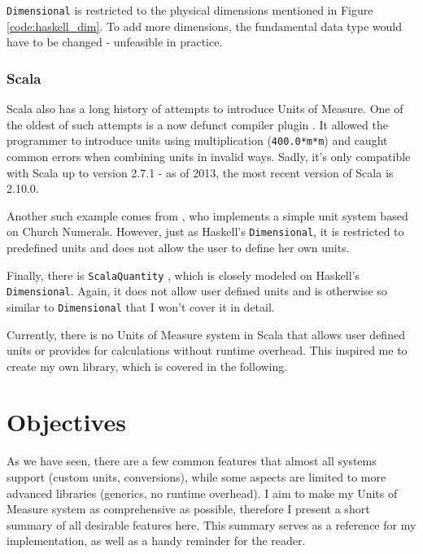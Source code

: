 \documentclass[12pt,oneside,a4paper]{scrbook}
\begin{document}
\verb/Dimensional/ is restricted to the physical dimensions mentioned in Figure \ref{code:haskell_dim}. To add more dimensions, the fundamental data type would have to be changed - unfeasible in practice.



\subsection{Scala}
Scala also has a long history of attempts to introduce Units of Measure. One of the oldest of such attempts is a now defunct compiler plugin \citep{Nygard09}. It allowed the programmer to introduce units using multiplication (\verb/400.0*m*m/) and caught common errors when combining units in invalid ways. Sadly, it's only compatible with Scala up to version 2.7.1 - as of 2013, the most recent version of Scala is 2.10.0.

Another such example comes from \citep{McBeath08}, who implements a simple unit system based on Church Numerals. However, just as Haskell's \verb/Dimensional/, it is restricted to predefined units and does not allow the user to define her own units.

Finally, there is \verb/ScalaQuantity/ \citep{Hans12}, which is closely modeled on Haskell's \verb/Dimensional/. Again, it does not allow user defined units and is otherwise so similar to \verb/Dimensional/ that I won't cover it in detail.

Currently, there is no Units of Measure system in Scala that allows user defined units or provides for calculations without runtime overhead. This inspired me to create my own library, which is covered in the following.




\chapter{Objectives}
As we have seen, there are a few common features that almost all systems support (custom units, conversions), while some aspects are limited to more advanced libraries (generics, no runtime overhead). I aim to make my Units of Measure system as comprehensive as possible, therefore I present a short summary of all desirable features here. This summary serves as a reference for my implementation, as well as a handy reminder for the reader.
\end{document}
